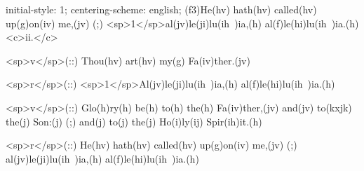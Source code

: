 initial-style: 1;
centering-scheme: english;
(f3)He(hv) hath(hv) called(hv) up(g)on(iv) me,(jv) (;) <sp>1</sp>al(jv)le(ji)lu(ih~)ia,(h) al(f)le(hi)lu(ih~)ia.(h) <c>ii.</c>

<sp>v</sp>(::) Thou(hv) art(hv) my(g) Fa(iv)ther.(jv)

<sp>r</sp>(::) <sp>1</sp>Al(jv)le(ji)lu(ih~)ia,(h) al(f)le(hi)lu(ih~)ia.(h)

<sp>v</sp>(::) Glo(h)ry(h) be(h) to(h) the(h) Fa(iv)ther,(jv) and(jv) to(kxjk) the(j) Son:(j) (;) and(j) to(j) the(j) Ho(i)ly(ij) Spir(ih)it.(h)

<sp>r</sp>(::) He(hv) hath(hv) called(hv) up(g)on(iv) me,(jv) (;) al(jv)le(ji)lu(ih~)ia,(h) al(f)le(hi)lu(ih~)ia.(h)